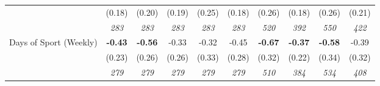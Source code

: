 \begin{tabular}{l c c c c c c c c c}
& (0.18) & (0.20) & (0.19) & (0.25) & (0.18) & (0.26) & (0.18) & (0.26) & (0.21) \\
& \textit{ 283 } & \textit{ 283 } & \textit{ 283 } & \textit{ 283 } & \textit{ 283 } & \textit{ 520 } & \textit{ 392 } & \textit{ 550 } & \textit{ 422 } \\
Days of Sport (Weekly) & \textbf{ -0.43 } & \textbf{ -0.56 } & -0.33 & -0.32 & -0.45 & \textbf{ -0.67 } & \textbf{-0.37} & \textbf{ -0.58 } & -0.39 \\
& (0.23) & (0.26) & (0.26) & (0.33) & (0.28) & (0.32) & (0.22) & (0.34) & (0.32) \\
& \textit{ 279 } & \textit{ 279 } & \textit{ 279 } & \textit{ 279 } & \textit{ 279 } & \textit{ 510 } & \textit{ 384 } & \textit{ 534 } & \textit{ 408 } \\
\bottomrule
\end{tabular}
